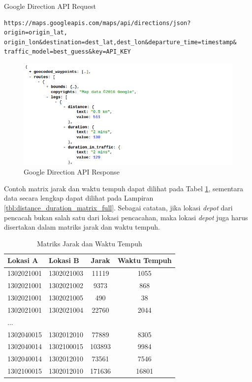 \begin{listing}
	\caption{Google Direction API Request}
	\label{lst:google_direction_api_request}
	\begin{verbatim}
https://maps.googleapis.com/maps/api/directions/json?origin=origin_lat,
origin_lon&destination=dest_lat,dest_lon&departure_time=timestamp&
traffic_model=best_guess&key=API_KEY
	\end{verbatim}
\end{listing}


\begin{figure}[h]
	\centering
	\includegraphics[width=\textwidth]{../../Resources/Images/google_direction_api_response}
	\caption{Google Direction API Response}
	\label{fig:google_direction_api_response}
\end{figure}


Contoh matrix jarak dan waktu tempuh dapat dilihat pada Tabel \ref{tbl:distance_duration_matrix}, sementara data secara lengkap dapat dilihat pada Lampiran \ref{tbl:distance_duration_matrix_full}. Sebagai catatan, jika lokasi \textit{depot} dari pencacah bukan salah satu dari lokasi pencacahan, maka lokasi \textit{depot} juga harus disertakan dalam matriks jarak dan waktu tempuh.


\begin{table}
	\centering
	\caption{Matriks Jarak dan Waktu Tempuh}
	\label{tbl:distance_duration_matrix}
	\begin{tabular}{llcc}
		\toprule
			Lokasi A & Lokasi B & Jarak & Waktu Tempuh\\
		\midrule
			1302021001 & 1302021003 & 11119 & 1055\\
			1302021001 & 1302021002 & 9373 & 868\\
			1302021001 & 1302021005 & 490 & 38\\
			1302021001 & 1302021004 & 22760 & 2044\\
			...\\
			1302040015 & 1302012010 & 77889 & 8305\\
			1302040014 & 1302100015 & 103893 & 9984\\
			1302040014 & 1302012010 & 73561 & 7546\\
			1302100015 & 1302012010 & 171636 & 16801\\
		\bottomrule
	\end{tabular}
\end{table}



